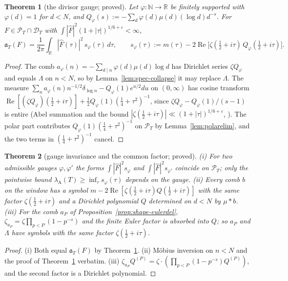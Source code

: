 \documentclass[11pt]{amsart}
\newtheorem{theorem}{Theorem}[section]
\theoremstyle{definition}
\theoremstyle{remark}
\newcommand{\R}{\mathbb R}
\newcommand{\N}{\mathbb N}
\newcommand{\Rel}{\operatorname{Re}}
\newcommand{\PT}{\mathcal P_T}
\newcommand{\lamA}{\lambda_{\mathrm A}(T)}
\newcommand{\Fh}{\widehat F}
\begin{document}
\begin{theorem}[the divisor gauge; proved]\label{thm:spec-gauge}
Let $\varphi:\N\to\R$ be finitely supported with $\varphi(d)=1$ for $d<N$, and $Q_\varphi(s):=-\sum_d\varphi(d)\mu(d)(\log d)d^{-s}$. For
$F\in\PT\cap\mathcal D_T$ with $\int|\Fh|^2(1+|\tau|)^{1/6+\varepsilon}<\infty$,
\[
\mathfrak a_T(F)=\frac1{2\pi}\int_\R|\Fh(\tau)|^2\,s_\varphi(\tau)\,d\tau,\qquad
s_\varphi(\tau):=m(\tau)-2\Rel\big[\zeta(\tfrac12+i\tau)\,Q_\varphi(\tfrac12+i\tau)\big].
\]
\end{theorem}
\begin{proof}
The comb $a_\varphi(n)=-\sum_{d\mid n}\varphi(d)\mu(d)\log d$ has Dirichlet series $\zeta Q_\varphi$ and equals $\Lambda$ on $n<N$, so by
Lemma~\ref{lem:spec-collapse} it may replace $\Lambda$. The measure $\sum_na_\varphi(n)n^{-1/2}\delta_{\log n}-Q_\varphi(1)e^{u/2}du$ on
$(0,\infty)$ has cosine transform $\Rel[(\zeta Q_\varphi)(\frac12+i\tau)]+\frac12Q_\varphi(1)(\frac14+\tau^2)^{-1}$, since
$\zeta Q_\varphi-Q_\varphi(1)/(s-1)$ is entire (Abel summation and the bound $|\zeta(\frac12+i\tau)|\ll(1+|\tau|)^{1/6+\varepsilon}$,
\cite[Ch.~V]{Titchmarsh1986}). The polar part contributes $Q_\varphi(1)(\frac14+\tau^2)^{-1}$ on $\PT$ by Lemma~\ref{lem:polarelim}, and
the two terms in $(\frac14+\tau^2)^{-1}$ cancel.
\end{proof}

\begin{theorem}[gauge invariance and the common factor; proved]\label{thm:spec-carrier}
(i) For two admissible gauges $\varphi,\varphi'$ the forms $\int|\Fh|^2s_\varphi$ and $\int|\Fh|^2s_{\varphi'}$ coincide on $\PT$; only
the pointwise bound $\lamA\ge\inf_\tau s_\varphi(\tau)$ depends on the gauge. (ii) Every comb $b$ on the window has a symbol
$m-2\Rel[\zeta(\frac12+i\tau)Q(\frac12+i\tau)]$ with the same factor $\zeta(\frac12+i\tau)$ and a Dirichlet polynomial $Q$ determined on
$d<N$ by $\mu*b$. (iii) For the comb $a_P$ of Proposition~\ref{prop:shape-eulerdel}, $\zeta_{a_P}=\zeta\prod_{p<P}(1-p^{-s})$ and the
finite Euler factor is absorbed into $Q$; so $a_P$ and $\Lambda$ have symbols with the same factor $\zeta(\frac12+i\tau)$.
\end{theorem}
\begin{proof}
(i) Both equal $\mathfrak a_T(F)$ by Theorem~\ref{thm:spec-gauge}. (ii) Möbius inversion on $n<N$ and the proof of
Theorem~\ref{thm:spec-gauge} verbatim. (iii) $\zeta_{a_P}Q^{(P)}=\zeta\cdot(\prod_{p<P}(1-p^{-s})Q^{(P)})$, and the second factor is a
Dirichlet polynomial.
\end{proof}
\end{document}
